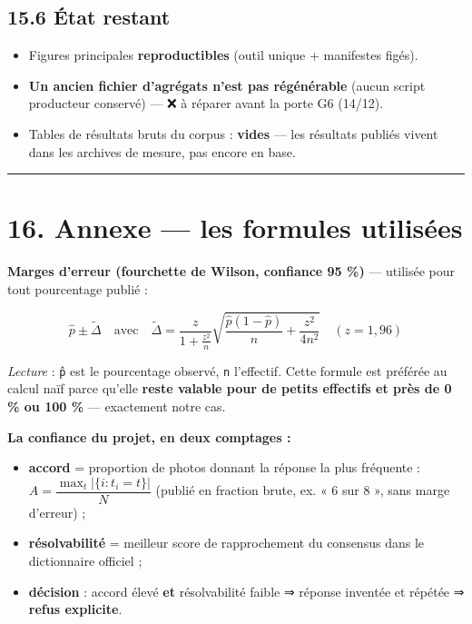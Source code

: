 \documentclass[11pt,a4paper]{article}
\newcommand{\fait}{\textcolor{green!45!black}{\ding{51}}}      %
\begin{document}
\subsection*{15.6 État restant}
\begin{itemize}  \item Figures principales \textbf{reproductibles} \fait (outil unique + manifestes figés).
\end{itemize}

\begin{itemize}  \item \textbf{Un ancien fichier d'agrégats n'est pas régénérable} (aucun script producteur conservé) — ❌ à réparer avant la porte G6 (14/12).
\end{itemize}

\begin{itemize}  \item Tables de résultats bruts du corpus : \textbf{vides} — les résultats publiés vivent dans les archives de mesure, pas encore en base.
\end{itemize}

\medskip\hrule\medskip
\section*{16. Annexe — les formules utilisées}
\textbf{Marges d'erreur (fourchette de Wilson, confiance 95 \%)} — utilisée pour tout pourcentage publié :

$$\hat{p} \pm \tilde{\Delta} \quad\text{avec}\quad \tilde{\Delta} = \frac{z}{1 + \frac{z^2}{n}}\sqrt{\frac{\hat{p}(1-\hat{p})}{n} + \frac{z^2}{4n^2}} \quad (z = 1{,}96)$$

\textit{Lecture} : \texttt{p̂} est le pourcentage observé, \texttt{n} l'effectif. Cette formule est préférée au calcul naïf parce qu'elle \textbf{reste valable pour de petits effectifs et près de 0 \% ou 100 \%} — exactement notre cas.

\textbf{La confiance du projet, en deux comptages :}

\begin{itemize}  \item \textbf{accord} = proportion de photos donnant la réponse la plus fréquente : $A = \dfrac{\max_t |\{i : t_i = t\}|}{N}$ (publié en fraction brute, ex. « 6 sur 8 », sans marge d'erreur) ;
\end{itemize}

\begin{itemize}  \item \textbf{résolvabilité} = meilleur score de rapprochement du consensus dans le dictionnaire officiel ;
\end{itemize}

\begin{itemize}  \item \textbf{décision} : accord élevé \textbf{et} résolvabilité faible ⇒ réponse inventée et répétée ⇒ \textbf{refus explicite}.
\end{itemize}
\end{document}
